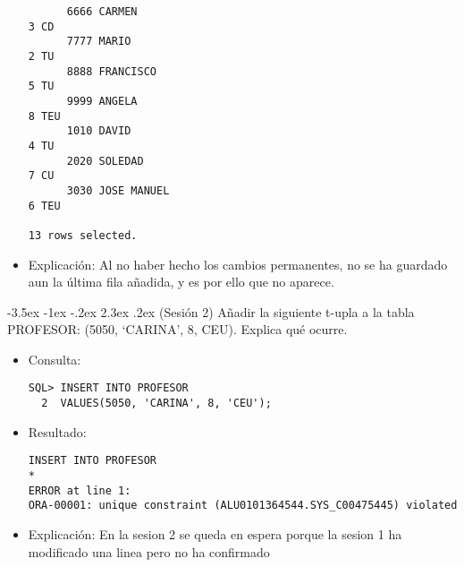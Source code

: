 \documentclass[11pt]{report}
\makeatletter
\renewcommand\chapter{\@startsection{chapter}{0}{\z@}%
    {-3.5ex \@plus -1ex \@minus -.2ex}%
    {2.3ex \@plus.2ex}%
    {\normalfont\Large\bfseries}}
\makeatother
\begin{document}
\begin{itemize}
\begin{verbatim}
      6666 CARMEN                                                                3 CD                                                                                                                   
      7777 MARIO                                                                 2 TU                                                                                                                   
      8888 FRANCISCO                                                             5 TU                                                                                                                   
      9999 ANGELA                                                                8 TEU                                                                                                                  
      1010 DAVID                                                                 4 TU                                                                                                                   
      2020 SOLEDAD                                                               7 CU                                                                                                                   
      3030 JOSE MANUEL                                                           6 TEU                                                                                                                  

13 rows selected.
  \end{verbatim}

  \item{Explicación:} Al no haber hecho los cambios permanentes, no se ha guardado aun la última fila añadida, y es por ello que no aparece.
\end{itemize}

\chapter{(Sesión 2) Añadir la siguiente t-upla a la tabla PROFESOR: (5050, ‘CARINA’, 8, CEU). Explica qué ocurre.}
\begin{itemize}
  \item Consulta:
  \begin{verbatim}
SQL> INSERT INTO PROFESOR
  2  VALUES(5050, 'CARINA', 8, 'CEU');
  \end{verbatim}
  \item{Resultado:}
  \begin{verbatim}
INSERT INTO PROFESOR
*
ERROR at line 1:
ORA-00001: unique constraint (ALU0101364544.SYS_C00475445) violated  
  \end{verbatim}
  \item Explicación: En la sesion 2 se queda en espera porque la sesion 1 ha modificado una linea pero no ha confirmado
\end{itemize}
\end{document}
